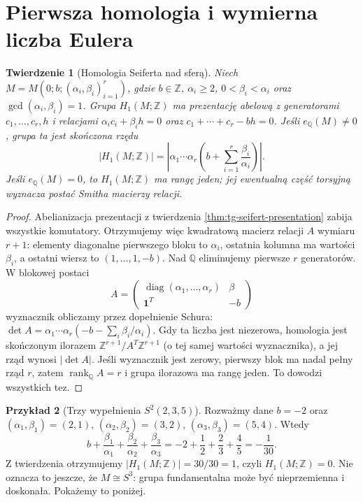 \documentclass[11pt,a4paper]{report}
\numberwithin{equation}{section}
\theoremstyle{plain}
\newtheorem{twierdzenie}{Twierdzenie}[section]
\theoremstyle{definition}
\newtheorem{przyklad}[twierdzenie]{Przykład}
\theoremstyle{remark}
\begin{document}
\section{Pierwsza homologia i wymierna liczba Eulera}
\label{sec:tg-seifert-homology}

\begin{twierdzenie}[Homologia Seiferta nad sferą]
\label{thm:tg-seifert-h1}
Niech $M=M(0;b;(\alpha_i,\beta_i)_{i=1}^r)$,
gdzie $b\in\mathbb Z$, $\alpha_i\ge2$,
$0<\beta_i<\alpha_i$ oraz $\gcd(\alpha_i,\beta_i)=1$.
Grupa $H_1(M;\mathbb Z)$ ma prezentację abelową
z generatorami $c_1,\ldots,c_r,h$ i relacjami
$\alpha_ic_i+\beta_ih=0$ oraz
$c_1+\cdots+c_r-bh=0$.
Jeśli $e_{\mathbb Q}(M)\ne0$, grupa ta jest skończona
rzędu
\[
|H_1(M;\mathbb Z)|=
\left|\alpha_1\cdots\alpha_r
\left(b+\sum_{i=1}^r\frac{\beta_i}{\alpha_i}\right)\right|.
\]
Jeśli $e_{\mathbb Q}(M)=0$, to $H_1(M;\mathbb Z)$ ma
rangę jeden; jej ewentualną część torsyjną wyznacza
postać Smitha macierzy relacji.
\end{twierdzenie}

\begin{proof}
Abelianizacja prezentacji z twierdzenia
\ref{thm:tg-seifert-presentation} zabija wszystkie
komutatory. Otrzymujemy więc kwadratową macierz
relacji $A$ wymiaru $r+1$: elementy diagonalne
pierwszego bloku to $\alpha_i$, ostatnia kolumna
ma wartości $\beta_i$, a ostatni wiersz to
$(1,\ldots,1,-b)$.
Nad $\mathbb Q$ eliminujemy pierwsze $r$ generatorów.
W blokowej postaci
\[
A=\begin{pmatrix}
\operatorname{diag}(\alpha_1,\ldots,\alpha_r)&\beta\\
\mathbf 1^T&-b
\end{pmatrix}
\]
wyznacznik obliczamy przez dopełnienie Schura:
$\det A=\alpha_1\cdots\alpha_r
(-b-\sum_i\beta_i/\alpha_i)$.
Gdy ta liczba jest niezerowa, homologia jest skończonym
ilorazem $\mathbb Z^{r+1}/A^T\mathbb Z^{r+1}$
(o tej samej wartości wyznacznika), a jej rząd
wynosi $|\det A|$. Jeśli wyznacznik jest zerowy,
pierwszy blok ma nadal pełny rząd $r$, zatem
$\operatorname{rank}_{\mathbb Q}A=r$ i grupa
ilorazowa ma rangę jeden. To dowodzi wszystkich tez.
\end{proof}

\begin{przyklad}[Trzy wypełnienia $S^2(2,3,5)$]
Rozważmy dane $b=-2$ oraz
$(\alpha_1,\beta_1)=(2,1)$,
$(\alpha_2,\beta_2)=(3,2)$,
$(\alpha_3,\beta_3)=(5,4)$.
Wtedy
\[
b+\frac{\beta_1}{\alpha_1}
+\frac{\beta_2}{\alpha_2}
+\frac{\beta_3}{\alpha_3}
=-2+\frac12+\frac23+\frac45=-\frac1{30}.
\]
Z twierdzenia otrzymujemy $|H_1(M;\mathbb Z)|=30/30=1$,
czyli $H_1(M;\mathbb Z)=0$. Nie oznacza to
jeszcze, że $M\cong S^3$: grupa fundamentalna może
być nieprzemienna i doskonała. Pokażemy to poniżej.
\end{przyklad}
\end{document}
